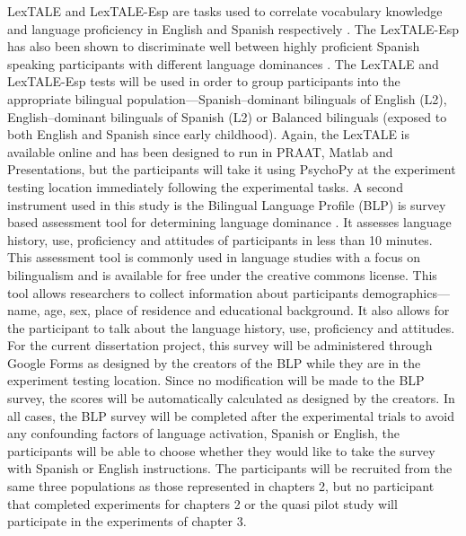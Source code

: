 LexTALE and LexTALE-Esp are tasks used to correlate vocabulary knowledge and language proficiency in English and Spanish respectively \citep{Izura2014-yw, Lemhofer2012-hz}. The LexTALE-Esp has also been shown to discriminate well between highly proficient Spanish speaking participants with different language dominances \citep{Ferre2017-lp}. The LexTALE and LexTALE-Esp tests will be used in order to group participants into the appropriate bilingual population—Spanish–dominant bilinguals of English (L2), English–dominant bilinguals of Spanish (L2) or Balanced bilinguals (exposed to both English and Spanish since early childhood). Again, the LexTALE is available online and has been designed to run in PRAAT, Matlab and Presentations, but the participants will take it using PsychoPy at the experiment testing location immediately following the experimental tasks. 
A second instrument used in this study is the Bilingual Language Profile (BLP) is survey based assessment tool for determining language dominance \citep{Birdsong2012-wd}. It assesses language history, use, proficiency and attitudes of participants in less than 10 minutes. This assessment tool is commonly used in language studies with a focus on bilingualism and is available for free under the creative commons license. This tool allows researchers to collect information about participants demographics—name, age, sex, place of residence and educational background. It also allows for the participant to talk about the language history, use, proficiency and attitudes. For the current dissertation project, this survey will be administered through Google Forms as designed by the creators of the BLP while they are in the experiment testing location. Since no modification will be made to the BLP survey, the scores will be automatically calculated as designed by the creators. In all cases, the BLP survey will be completed after the experimental trials to avoid any confounding factors of language activation, Spanish or English, the participants will be able to choose whether they would like to take the survey with Spanish or English instructions. The participants will be recruited from the same three populations as those represented in chapters 2, but no participant that completed experiments for chapters 2 or the quasi pilot study will participate in the experiments of chapter 3.




